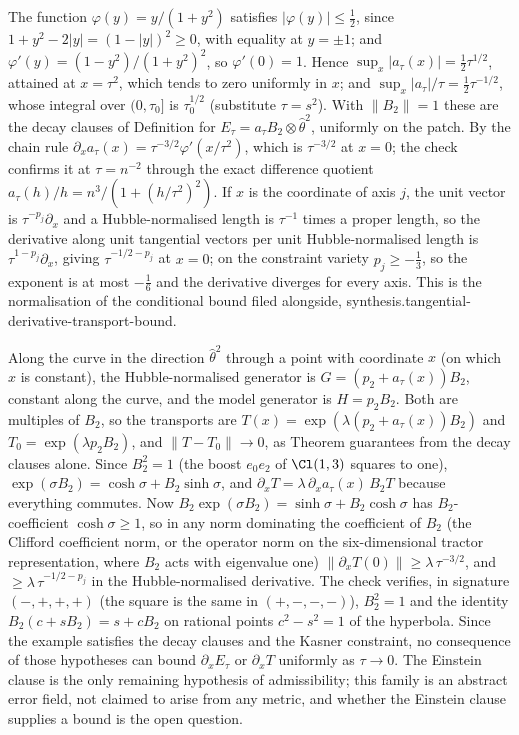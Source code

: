 The function $\varphi(y) = y/(1 + y^{2})$ satisfies $|\varphi(y)| \leq \tfrac12$, since $1 + y^{2} - 2|y| = (1 - |y|)^{2} \geq 0$, with equality at $y = \pm 1$; and $\varphi'(y) = (1 - y^{2})/(1 + y^{2})^{2}$, so $\varphi'(0) = 1$. Hence $\sup_{x}|a_{\tau}(x)| = \tfrac12\tau^{1/2}$, attained at $x = \tau^{2}$, which tends to zero uniformly in $x$; and $\sup_{x}|a_{\tau}|/\tau = \tfrac12\tau^{-1/2}$, whose integral over $(0, \tau_{0}]$ is $\tau_{0}^{1/2}$ (substitute $\tau = s^{2}$). With $\|B_{2}\| = 1$ these are the decay clauses of Definition  for $E_{\tau} = a_{\tau}B_{2}\otimes\hat\theta^{2}$, uniformly on the patch. By the chain rule $\partial_{x}a_{\tau}(x) = \tau^{-3/2}\varphi'(x/\tau^{2})$, which is $\tau^{-3/2}$ at $x = 0$; the check confirms it at $\tau = n^{-2}$ through the exact difference quotient $a_{\tau}(h)/h = n^{3}/(1 + (h/\tau^{2})^{2})$. If $x$ is the coordinate of axis $j$, the unit vector is $\tau^{-p_{j}}\partial_{x}$ and a Hubble-normalised length is $\tau^{-1}$ times a proper length, so the derivative along unit tangential vectors per unit Hubble-normalised length is $\tau^{1 - p_{j}}\partial_{x}$, giving $\tau^{-1/2 - p_{j}}$ at $x = 0$; on the constraint variety $p_{j} \geq -\tfrac13$, so the exponent is at most $-\tfrac16$ and the derivative diverges for every axis. This is the normalisation of the conditional bound filed alongside, synthesis.tangential-derivative-transport-bound.

Along the curve in the direction $\hat\theta^{2}$ through a point with coordinate $x$ (on which $x$ is constant), the Hubble-normalised generator is $G = (p_{2} + a_{\tau}(x))B_{2}$, constant along the curve, and the model generator is $H = p_{2}B_{2}$. Both are multiples of $B_{2}$, so the transports are $T(x) = \exp(\lambda(p_{2} + a_{\tau}(x))B_{2})$ and $T_{0} = \exp(\lambda p_{2}B_{2})$, and $\|T - T_{0}\| \to 0$, as Theorem  guarantees from the decay clauses alone. Since $B_{2}^{2} = 1$ (the boost $e_{0}e_{2}$ of $\Cl(1,3)$ squares to one), $\exp(\sigma B_{2}) = \cosh\sigma + B_{2}\sinh\sigma$, and $\partial_{x}T = \lambda\,\partial_{x}a_{\tau}(x)\,B_{2}T$ because everything commutes. Now $B_{2}\exp(\sigma B_{2}) = \sinh\sigma + B_{2}\cosh\sigma$ has $B_{2}$-coefficient $\cosh\sigma \geq 1$, so in any norm dominating the coefficient of $B_{2}$ (the Clifford coefficient norm, or the operator norm on the six-dimensional tractor representation, where $B_{2}$ acts with eigenvalue one) $\|\partial_{x}T(0)\| \geq \lambda\,\tau^{-3/2}$, and $\geq \lambda\,\tau^{-1/2 - p_{j}}$ in the Hubble-normalised derivative. The check verifies, in signature $(-,+,+,+)$ (the square is the same in $(+,-,-,-)$), $B_{2}^{2} = 1$ and the identity $B_{2}(c + sB_{2}) = s + cB_{2}$ on rational points $c^{2} - s^{2} = 1$ of the hyperbola. Since the example satisfies the decay clauses and the Kasner constraint, no consequence of those hypotheses can bound $\partial_{x}E_{\tau}$ or $\partial_{x}T$ uniformly as $\tau \to 0$. The Einstein clause is the only remaining hypothesis of admissibility; this family is an abstract error field, not claimed to arise from any metric, and whether the Einstein clause supplies a bound is the open question.

